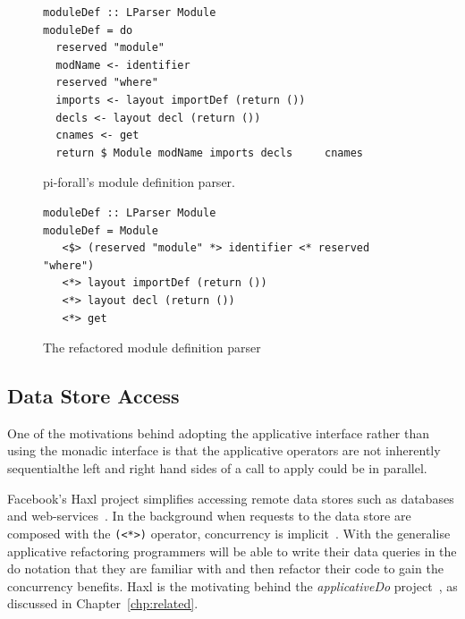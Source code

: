\begin{figure}[t]
\begin{lstlisting}
moduleDef :: LParser Module
moduleDef = do
  reserved "module"
  modName <- identifier
  reserved "where"
  imports <- layout importDef (return ())
  decls <- layout decl (return ())
  cnames <- get
  return $ Module modName imports decls     cnames
\end{lstlisting}
\caption{pi-forall's module definition parser.}
\label{piParse}
\end{figure}

\begin{figure}[t]
\begin{lstlisting}
moduleDef :: LParser Module
moduleDef = Module
   <$> (reserved "module" *> identifier <* reserved "where") 
   <*> layout importDef (return ()) 
   <*> layout decl (return ()) 
   <*> get
\end{lstlisting}
\caption{The refactored module definition parser}
\label{piParse_ref}
\end{figure}



\subsection{Data Store Access}

One of the \DIFdelbegin {}\DIFdelend \DIFaddbegin {}\DIFaddend motivations behind adopting the applicative interface rather than using the monadic interface \DIFdelbegin {}\DIFdelend is that the applicative operators are not inherently sequential\DIFdelbegin {}\DIFdelend \DIFaddbegin \DIFadd{: }\DIFaddend the left and right hand sides of a call to apply could be \DIFdelbegin {}\DIFdelend \DIFaddbegin {}\DIFaddend in parallel. 

Facebook's Haxl project simplifies accessing remote data stores such as databases and web-services~\DIFdelbegin {}\DIFdelend \DIFaddbegin {}\DIFaddend . In the background when requests to the data store are composed with the \texttt{(<*>)} operator, concurrency is implicit~\DIFdelbegin {}\DIFdelend \DIFaddbegin {}\DIFaddend . With the generalise applicative refactoring programmers will be able to write their data queries in the do notation that they are familiar with and then refactor their code to gain the concurrency benefits. Haxl is the motivating behind the \textit{applicativeDo} project~\DIFdelbegin {}\DIFdelend \DIFaddbegin {}\DIFaddend , as discussed \DIFdelbegin {}\DIFdelend \DIFaddbegin {}\DIFaddend in Chapter~\ref{chp:related}.


